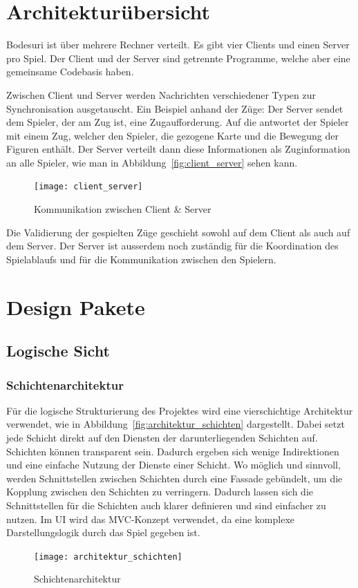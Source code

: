 \documentclass[12pt,halfparskip]{scrartcl}
\begin{document}


\section{Architekturübersicht}

Bodesuri ist über mehrere Rechner verteilt. Es gibt vier Clients und einen Server pro Spiel. Der Client und der Server sind getrennte Programme, welche aber eine gemeinsame Codebasis haben.

Zwischen Client und Server werden Nachrichten verschiedener Typen zur Synchronisation ausgetauscht. Ein Beispiel anhand der Züge: Der Server sendet dem Spieler, der am Zug ist, eine Zugaufforderung. Auf die antwortet der Spieler mit einem Zug, welcher den Spieler, die gezogene Karte und die Bewegung der Figuren enthält. Der Server verteilt dann diese Informationen als Zuginformation an alle Spieler, wie man in Abbildung~\vref{fig:client_server} sehen kann.

\begin{figure}[h]
	\centering
	\texttt{[image: client\_server]}
	\caption{Kommunikation zwischen Client \& Server}
	\label{fig:client_server}
\end{figure}

Die Validierung der gespielten Züge geschieht sowohl auf dem Client als auch auf dem Server. Der Server ist ausserdem noch zuständig für die Koordination des Spielablaufs und für die Kommunikation zwischen den Spielern.

\clearpage
\section{Design Pakete}
\label{design_pakete}

\subsection{Logische Sicht}
\label{sub:logische_sicht}

\subsubsection{Schichtenarchitektur}
\label{sub:schichtenarchitektur}
Für die logische Strukturierung des Projektes wird eine vierschichtige Architektur verwendet, wie in Abbildung~\vref{fig:architektur_schichten} dargestellt. Dabei setzt jede Schicht direkt auf den Diensten der darunterliegenden Schichten auf. Schichten können transparent sein. Dadurch ergeben sich wenige Indirektionen und eine einfache Nutzung der Dienste einer Schicht. Wo möglich und sinnvoll, werden Schnittstellen zwischen Schichten durch eine Fassade gebündelt, um die Kopplung zwischen den Schichten zu verringern. Dadurch lassen sich die Schnittstellen für die Schichten auch klarer definieren und sind einfacher zu nutzen. Im UI wird das MVC-Konzept verwendet, da eine komplexe Darstellungslogik durch das Spiel gegeben ist.
\begin{figure}
	\centering
	\texttt{[image: architektur\_schichten]}
	\caption{Schichtenarchitektur}
	\label{fig:architektur_schichten}
\end{figure}
\end{document}
